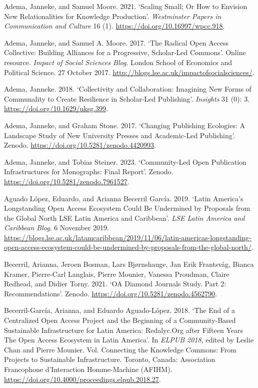 \documentclass[a4paper,
fontsize=11pt,
oneside,
numbers=noperiodatend,
parskip=half-,
bibliography=totoc,
final
]{scrartcl}
\begin{document}
Adema, Janneke, and Samuel Moore. 2021. \enquote*{Scaling Small; Or How
to Envision New Relationalities for Knowledge Production}.
\emph{Westminster Papers in Communication and Culture} 16 (1).
\url{https://doi.org/10.16997/wpcc.918}.

Adema, Janneke, and Samuel A. Moore. 2017. \enquote*{The Radical Open
Access Collective: Building Alliances for a Progressive, Scholar-Led
Commons}. Online resource. \emph{Impact of Social Sciences Blog}. London
School of Economics and Political Science. 27 October 2017.
\url{http://blogs.lse.ac.uk/impactofsocialsciences/}.

Adema, Janneke. 2018. \enquote*{Collectivity and Collaboration:
Imagining New Forms of Communality to Create Resilience in Scholar-Led
Publishing}. \emph{Insights} 31 (0): 3.
\url{https://doi.org/10.1629/uksg.399}.

Adema, Janneke, and Graham Stone. 2017. \enquote*{Changing Publishing
Ecologies: A Landscape Study of New University Presses and Academic-Led
Publishing}. Zenodo. \url{https://doi.org/10.5281/zenodo.4420993}.

Adema, Janneke, and Tobias Steiner. 2023. \enquote*{Community-Led Open
Publication Infrastructures for Monographs: Final Report}. Zenodo.
\url{https://doi.org/10.5281/zenodo.7961527}.

Aguado López, Eduardo, and Arianna Becerril García. 2019.
\enquote*{Latin America's Longstanding Open Access Ecosystem Could Be
Undermined by Proposals from the Global North \textbar{} LSE Latin
America and Caribbean}. \emph{LSE Latin America and Caribbean Blog}. 6
November 2019.
\url{https://blogs.lse.ac.uk/latamcaribbean/2019/11/06/latin-americas-longstanding-open-access-ecosystem-could-be-undermined-by-proposals-from-the-global-north/}.

Becerril, Arianna, Jeroen Bosman, Lars Bjørnshauge, Jan Erik Frantsvåg,
Bianca Kramer, Pierre-Carl Langlais, Pierre Mounier, Vanessa Proudman,
Claire Redhead, and Didier Torny. 2021. \enquote*{OA Diamond Journals
Study. Part 2: Recommendations}. Zenodo.
\url{https://doi.org/10.5281/zenodo.4562790}.

Becerril-García, Arianna, and Eduardo Aguado-López. 2018. \enquote*{The
End of a Centralized Open Access Project and the Beginning of a
Community-Based Sustainable Infrastructure for Latin America:
Redalyc.Org after Fifteen Years The Open Access Ecosystem in Latin
America}. In \emph{ELPUB 2018}, edited by Leslie Chan and Pierre
Mounier. Vol. Connecting the Knowledge Commons: From Projects to
Sustainable Infrastructure. Toronto, Canada: Association Francophone
d'Interaction Homme-Machine (AFIHM).
\url{https://doi.org/10.4000/proceedings.elpub.2018.27}.
\end{document}
